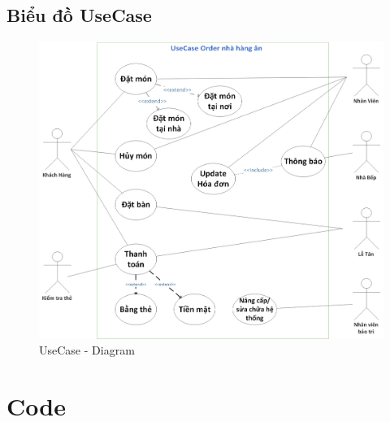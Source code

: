 \documentclass[a4paper,12pt]{report}
\begin{document}
\section{Biểu đồ UseCase}
	\begin{figure}[H]
		\centering
		\includegraphics[scale=0.35]{UseCase1.png}
		\caption{UseCase - Diagram}
	\end{figure}

\chapter{Code}
\end{document}
